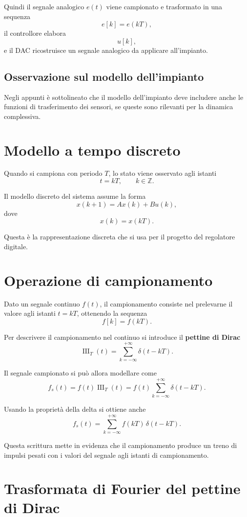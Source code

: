 Quindi il segnale analogico \(e(t)\) viene campionato e trasformato in una sequenza
\[
e[k]=e(kT),
\]
il controllore elabora
\[
u[k],
\]
e il DAC ricostruisce un segnale analogico da applicare all'impianto.

\subsection{Osservazione sul modello dell'impianto}

Negli appunti è sottolineato che il modello dell'impianto deve includere anche
le funzioni di trasferimento dei sensori, se queste sono rilevanti per la dinamica complessiva.

\section{Modello a tempo discreto}

Quando si campiona con periodo \(T\), lo stato viene osservato agli istanti
\[
t=kT, \qquad k\in\mathbb{Z}.
\]

Il modello discreto del sistema assume la forma
\[
x(k+1)=Ax(k)+Bu(k),
\]
dove
\[
x(k)=x(kT).
\]

Questa è la rappresentazione discreta che si usa per il progetto del regolatore digitale.

\section{Operazione di campionamento}

Dato un segnale continuo \(f(t)\), il campionamento consiste nel prelevarne il valore
agli istanti \(t=kT\), ottenendo la sequenza
\[
f[k]=f(kT).
\]

Per descrivere il campionamento nel continuo si introduce il \textbf{pettine di Dirac}
\[
\operatorname{III}_T(t)=\sum_{k=-\infty}^{+\infty}\delta(t-kT).
\]

Il segnale campionato si può allora modellare come
\[
f_s(t)=f(t)\operatorname{III}_T(t)
=
f(t)\sum_{k=-\infty}^{+\infty}\delta(t-kT).
\]

Usando la proprietà della delta si ottiene anche
\[
f_s(t)=\sum_{k=-\infty}^{+\infty} f(kT)\,\delta(t-kT).
\]

Questa scrittura mette in evidenza che il campionamento produce un treno di impulsi
pesati con i valori del segnale agli istanti di campionamento.

\section{Trasformata di Fourier del pettine di Dirac}

